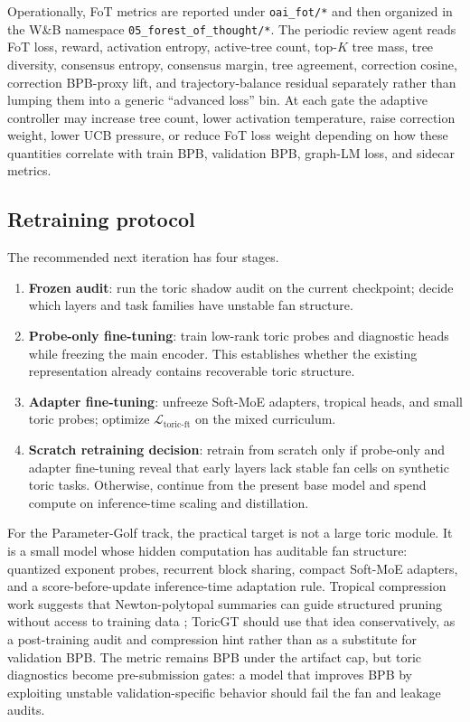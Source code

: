 \documentclass[11pt]{article}
\theoremstyle{definition}
\theoremstyle{plain}
\theoremstyle{remark}
\numberwithin{equation}{section}
\begin{document}
Operationally, FoT metrics are reported under \texttt{oai\_fot/*} and then organized in the W\&B namespace \texttt{05\_forest\_of\_thought/*}.  The periodic review agent reads FoT loss, reward, activation entropy, active-tree count, top-$K$ tree mass, tree diversity, consensus entropy, consensus margin, tree agreement, correction cosine, correction BPB-proxy lift, and trajectory-balance residual separately rather than lumping them into a generic ``advanced loss'' bin.  At each gate the adaptive controller may increase tree count, lower activation temperature, raise correction weight, lower UCB pressure, or reduce FoT loss weight depending on how these quantities correlate with train BPB, validation BPB, graph-LM loss, and sidecar metrics.

\subsection{Retraining protocol}

The recommended next iteration has four stages.
\begin{enumerate}[leftmargin=2em]
  \item \textbf{Frozen audit}: run the toric shadow audit on the current checkpoint; decide which layers and task families have unstable fan structure.
  \item \textbf{Probe-only fine-tuning}: train low-rank toric probes and diagnostic heads while freezing the main encoder.  This establishes whether the existing representation already contains recoverable toric structure.
  \item \textbf{Adapter fine-tuning}: unfreeze Soft-MoE adapters, tropical heads, and small toric probes; optimize $\mathcal L_{\mathrm{toric}\text{-}\mathrm{ft}}$ on the mixed curriculum.
  \item \textbf{Scratch retraining decision}: retrain from scratch only if probe-only and adapter fine-tuning reveal that early layers lack stable fan cells on synthetic toric tasks.  Otherwise, continue from the present base model and spend compute on inference-time scaling and distillation.
\end{enumerate}
For the Parameter-Golf track, the practical target is not a large toric module.  It is a small model whose hidden computation has auditable fan structure: quantized exponent probes, recurrent block sharing, compact Soft-MoE adapters, and a score-before-update inference-time adaptation rule.  Tropical compression work suggests that Newton-polytopal summaries can guide structured pruning without access to training data \cite{fotopoulos2024tropnnc}; ToricGT should use that idea conservatively, as a post-training audit and compression hint rather than as a substitute for validation BPB.  The metric remains BPB under the artifact cap, but toric diagnostics become pre-submission gates: a model that improves BPB by exploiting unstable validation-specific behavior should fail the fan and leakage audits.
\end{document}

